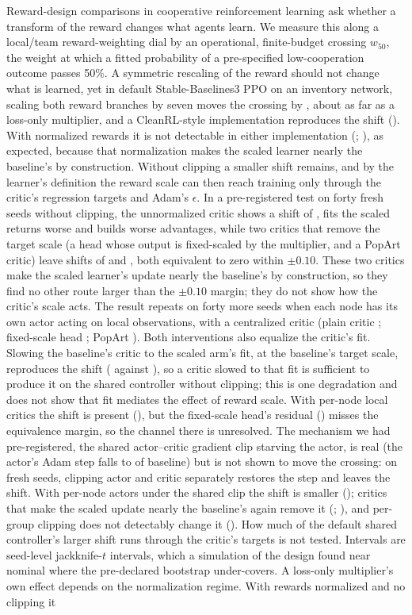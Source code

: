 Reward-design comparisons in cooperative reinforcement learning ask whether a transform of the reward changes what agents learn. We measure this along a local/team reward-weighting dial by an operational, finite-budget crossing $w_{50}$, the weight at which a fitted probability of a pre-specified low-cooperation outcome passes 50\%. A symmetric rescaling of the reward should not change what is learned, yet in default Stable-Baselines3 PPO on an inventory network, scaling both reward branches by seven moves the crossing by \VjtPStd{}, about as far as a loss-only multiplier, and a CleanRL-style implementation reproduces the shift (\VjtPElevenRaw{}). With normalized rewards it is not detectable in either implementation (\VjtPSymBoth{}; \VjtPElevenDefault{}), as expected, because that normalization makes the scaled learner nearly the baseline's by construction. Without clipping a smaller shift remains, and by the learner's definition the reward scale can then reach training only through the critic's regression targets and Adam's $\epsilon$. In a pre-registered test on forty fresh seeds without clipping, the unnormalized critic shows a shift of \VxfPlain{}, fits the scaled returns worse and builds worse advantages, while two critics that remove the target scale (a head whose output is fixed-scaled by the multiplier, and a PopArt critic) leave shifts of \VxfHead{} and \VxfPop{}, both equivalent to zero within $\pm0.10$. These two critics make the scaled learner's update nearly the baseline's by construction, so they find no other route larger than the $\pm0.10$ margin; they do not show how the critic's scale acts. The result repeats on forty more seeds when each node has its own actor acting on local observations, with a centralized critic (plain critic \VxvPlain{}; fixed-scale head \VxvHead{}; PopArt \VxvPop{}). Both interventions also equalize the critic's fit. Slowing the baseline's critic to the scaled arm's fit, at the baseline's target scale, reproduces the shift (\VxeiDeg{} against \VxeiPlain{}), so a critic slowed to that fit is sufficient to produce it on the shared controller without clipping; this is one degradation and does not show that fit mediates the effect of reward scale. With per-node local critics the shift is present (\VxsixPlain{}), but the fixed-scale head's residual (\VxsixHead{}) misses the equivalence margin, so the channel there is unresolved. The mechanism we had pre-registered, the shared actor--critic gradient clip starving the actor, is real (the actor's Adam step falls to \VxoGlobStep{} of baseline) but is not shown to move the crossing: on fresh seeds, clipping actor and critic separately restores the step and leaves the shift. With per-node actors under the shared clip the shift is smaller (\VxsevPlain{}); critics that make the scaled update nearly the baseline's again remove it (\VxsevHead{}; \VxsevPop{}), and per-group clipping does not detectably change it (\VxsevChGroup{}). How much of the default shared controller's larger shift runs through the critic's targets is not tested. Intervals are seed-level jackknife-$t$ intervals, which a simulation of the design found near nominal where the pre-declared bootstrap under-covers. A loss-only multiplier's own effect depends on the normalization regime. With rewards normalized and no clipping it 